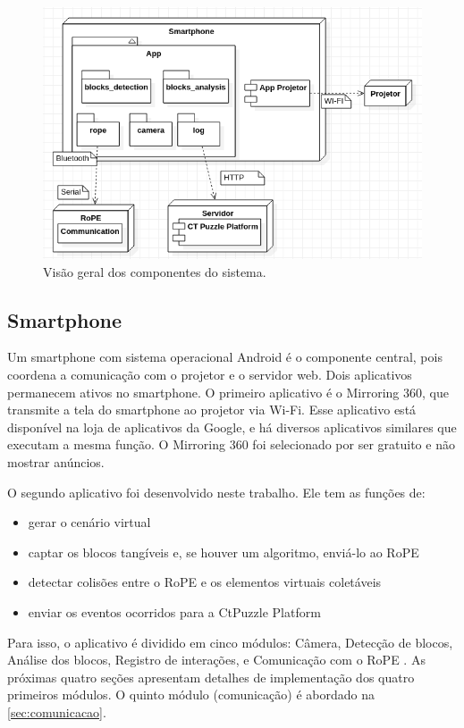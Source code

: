 \begin{figure}[!h]
    \centering
    \includegraphics[width=.8\linewidth,fbox]{figs/system_overview.png}
    \caption{Visão geral dos componentes do sistema.}
    \label{fig:system_overview}
\end{figure}

\subsection{Smartphone}
\label{sec:smartphone}
Um smartphone com sistema operacional Android é o componente central, pois coordena a comunicação com o projetor e o servidor web. Dois aplicativos permanecem ativos no smartphone. O primeiro aplicativo é o Mirroring 360, que transmite a tela do smartphone ao projetor via Wi-Fi. Esse aplicativo está disponível na loja de aplicativos da Google, e há diversos aplicativos similares que executam a mesma função. O Mirroring 360 foi selecionado por ser gratuito e não mostrar anúncios.

O segundo aplicativo foi desenvolvido neste trabalho. Ele tem as funções de:
\begin{itemize}
    \item gerar o cenário virtual
    \item captar os blocos tangíveis e, se houver um algoritmo, enviá-lo ao RoPE
    \item detectar colisões entre o RoPE e os elementos virtuais coletáveis
    \item enviar os eventos ocorridos para a CtPuzzle Platform
\end{itemize}

Para isso, o aplicativo é dividido em cinco módulos: Câmera, Detecção de blocos, Análise dos blocos, Registro de interações, e Comunicação com o RoPE . As próximas quatro seções apresentam detalhes de implementação dos quatro primeiros módulos. O quinto módulo (comunicação) é abordado na \autoref{sec:comunicacao}.

